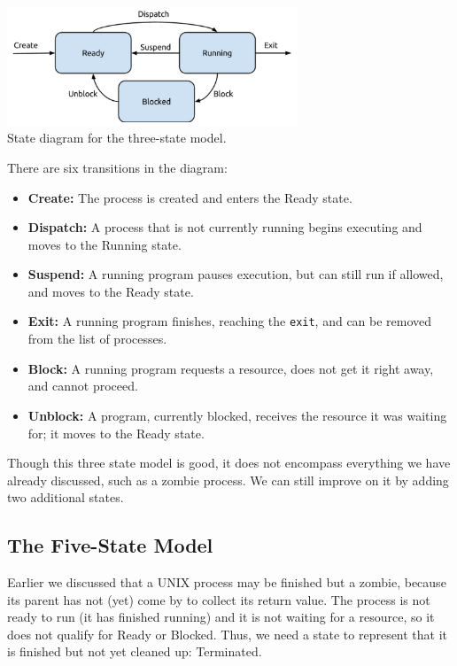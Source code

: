 \begin{center}
\includegraphics[width=0.65\textwidth]{images/3-state-model.png}\\
State diagram for the three-state model.
\end{center}

There are six transitions in the diagram:
\begin{itemize}
	\item \textbf{Create:} The process is created and enters the Ready state.
	\item \textbf{Dispatch:} A process that is not currently running begins executing and moves to the Running state.
	\item \textbf{Suspend:} A running program pauses execution, but can still run if allowed, and moves to the Ready state.
	\item \textbf{Exit:} A running program finishes, reaching the \texttt{exit}, and can be removed from the list of processes.
	\item \textbf{Block:} A running program requests a resource, does not get it right away, and cannot proceed.
	\item \textbf{Unblock:} A program, currently blocked, receives the resource it was waiting for; it moves to the Ready state.
\end{itemize}


Though this three state model is good, it does not encompass everything we have already discussed, such as a zombie process. We can still improve on it by adding two additional states. 

\subsection*{The Five-State Model}

Earlier we discussed that a UNIX process may be finished but a zombie, because its parent has not (yet) come by to collect its return value. The process is not ready to run (it has finished running) and it is not waiting for a resource, so it does not qualify for Ready or Blocked. Thus, we need a state to represent that it is finished but not yet cleaned up: Terminated.

